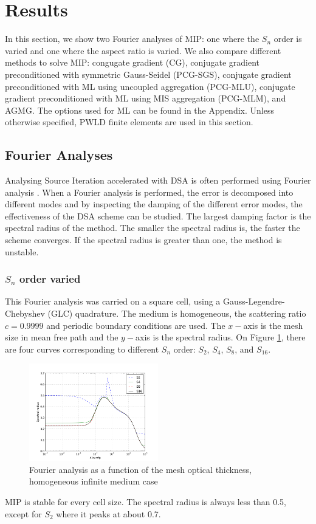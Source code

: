 \section{Results} \label{sec_res}
In this section, we show two Fourier analyses of MIP: one where the $S_n$ order is
varied and one where the aspect ratio is varied. We also compare different
methods to solve MIP: congugate gradient (CG), conjugate gradient
preconditioned with symmetric Gauss-Seidel (PCG-SGS), conjugate gradient
preconditioned with ML using uncoupled aggregation (PCG-MLU),
conjugate gradient preconditioned with ML using MIS aggregation (PCG-MLM),
and AGMG. The options used for ML can be found in the Appendix. Unless
otherwise specified, PWLD finite elements are used in this section.
\subsection{Fourier Analyses}
Analysing Source Iteration accelerated with DSA is often performed using
Fourier analysis \cite{larsen_dsa,consistent_p1}. When a Fourier analysis is
performed, the error is decomposed into different modes and by inspecting the 
damping of the different error modes, the effectiveness of the DSA scheme can 
be studied. The largest damping factor is the spectral radius of the method. 
The smaller the spectral radius is, the faster the scheme converges. If the 
spectral radius is greater than one, the method is unstable. 
\subsubsection{$S_n$ order varied}
This Fourier analysis was carried on a square cell, using a
Gauss-Legendre-Chebyshev (GLC) quadrature. The medium is homogeneous, the scattering
ratio $c=0.9999$ and periodic boundary conditions are used. The $x-$axis is the mesh
size in mean free path and the $y-$axis is the spectral radius. On Figure
\ref{fig_fa_op}, there are four curves corresponding to different $S_n$ order: 
$S_2$, $S_4$, $S_8$, and $S_{16}$.
\begin{figure}[H]
  \centering
  \includegraphics[width=0.5\textwidth]{./Dsa/sn_order_9999}
  \caption{Fourier analysis as a function of the mesh optical thickness,
  homogeneous infinite medium case}
  \label{fig_fa_op}
\end{figure}
MIP is stable for every cell size. The spectral radius is always less than
0.5, except for $S_2$ where it peaks at about 0.7.
